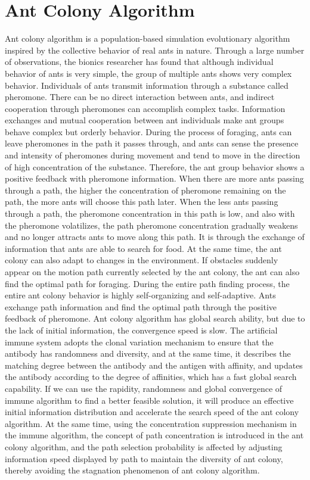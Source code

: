 \documentclass[11pt,a4paper,oldfontcommands]{memoir}
\begin{document}
\section{Ant Colony Algorithm}
Ant colony algorithm is a population-based simulation evolutionary algorithm inspired by the collective behavior of real ants in nature. Through a large number of observations, the bionics researcher has found that although individual behavior of ants is very simple, the group of multiple ants shows very complex behavior. Individuals of ants transmit information through a substance called pheromone. There can be no direct interaction between ants, and indirect cooperation through pheromones can accomplish complex tasks. Information exchanges and mutual cooperation between ant individuals make ant groups behave complex but orderly behavior.
During the process of foraging, ants can leave pheromones in the path it passes through, and ants can sense the presence and intensity of pheromones during movement and tend to move in the direction of high concentration of the substance. Therefore, the ant group behavior shows a positive feedback with pheromone information. When there are more ants passing through a path, the higher the concentration of pheromone remaining on the path, the more ants will choose this path later. When the less ants passing through a path, the pheromone concentration in this path is low, and also with the pheromone volatilizes, the path pheromone concentration gradually weakens and no longer attracts ants to move along this path. It is through the exchange of information that ants are able to search for food. At the same time, the ant colony can also adapt to changes in the environment. If obstacles suddenly appear on the motion path currently selected by the ant colony, the ant can also find the optimal path for foraging. During the entire path finding process, the entire ant colony behavior is highly self-organizing and self-adaptive. Ants exchange path information and find the optimal path through the positive feedback of pheromone.
Ant colony algorithm has global search ability, but due to the lack of initial information, the convergence speed is slow. The artificial immune system adopts the clonal variation mechanism to ensure that the antibody has randomness and diversity, and at the same time, it describes the matching degree between the antibody and the antigen with affinity, and updates the antibody according to the degree of affinities, which has a fast global search capability. If we can use the rapidity, randomness and global convergence of immune algorithm to find a better feasible solution, it will produce an effective initial information distribution and accelerate the search speed of the ant colony algorithm. At the same time, using the concentration suppression mechanism in the immune algorithm, the concept of path concentration is introduced in the ant colony algorithm, and the path selection probability is affected by adjusting information speed displayed by path to maintain the diversity of ant colony, thereby avoiding the stagnation phenomenon of ant colony algorithm.
\end{document}
